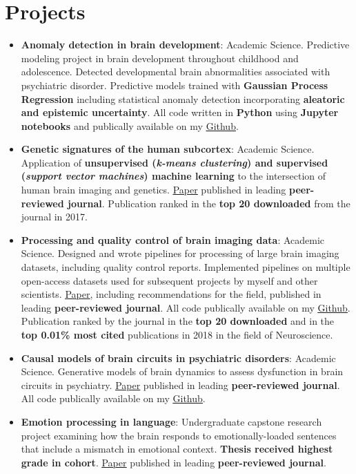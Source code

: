 \documentclass[letterpaper,10pt]{article}
\newcommand{\resumeItem}[2]{
  \item\small{
    \textbf{#1}{: #2 \vspace{-2pt}}
  }
}
\newcommand{\resumeSubItem}[2]{\resumeItem{#1}{#2}\vspace{-4pt}}
\newcommand{\resumeSubHeadingListStart}{\begin{itemize}[leftmargin=*]}
\newcommand{\resumeSubHeadingListEnd}{\end{itemize}}
\begin{document}
\section{Projects}
  \resumeSubHeadingListStart
    \resumeSubItem{Anomaly detection in brain development}
      {Academic Science. Predictive modeling project in brain development throughout childhood and adolescence. Detected developmental brain abnormalities associated with psychiatric disorder. Predictive models trained with \textbf{Gaussian Process Regression} including statistical anomaly detection incorporating \textbf{aleatoric and epistemic uncertainty}. All code written in \textbf{Python} using \textbf{Jupyter notebooks} and publically available on my \href{https://github.com/lindenmp/NormativeNeuroDev_CrossSec}{\underline{Github}}.}
    \resumeSubItem{Genetic signatures of the human subcortex}
      {Academic Science. Application of \textbf{unsupervised (\textit{k-means clustering}) and supervised (\textit{support vector machines}) machine learning} to the intersection of human brain imaging and genetics. \href{https://onlinelibrary.wiley.com/doi/full/10.1111/gbb.12386}{\underline{Paper}} published in leading \textbf{peer-reviewed journal}. Publication ranked in the \textbf{top 20 downloaded} from the journal in 2017.}
    \resumeSubItem{Processing and quality control of brain imaging data}
      {Academic Science. Designed and wrote pipelines for processing of large brain imaging datasets, including quality control reports. Implemented pipelines on multiple open-access datasets used for subsequent projects by myself and other scientists. \href{https://www.sciencedirect.com/science/article/pii/S1053811917310972}{\underline{Paper}}, including recommendations for the field, published in leading \textbf{peer-reviewed journal}. All code publically available on my \href{https://github.com/lindenmp/rs-fMRI}{\underline{Github}}. Publication ranked by the journal in the \textbf{top 20 downloaded} and in the \textbf{top 0.01\% most cited} publications in 2018 in the field of Neuroscience.}
    \resumeSubItem{Causal models of brain circuits in psychiatric disorders}
      {Academic Science. Generative models of brain dynamics to assess dysfunction in brain circuits in psychiatry. \href{https://www.sciencedirect.com/science/article/pii/S1053811919306585}{\underline{Paper}} published in leading \textbf{peer-reviewed journal}. All code publically available on my \href{https://github.com/lindenmp/rs-fMRI/tree/master/stats/spDCM}{\underline{Github}}.}
    \resumeSubItem{Emotion processing in language}
      {Undergraduate capstone research project examining how the brain responds to emotionally-loaded sentences that include a mismatch in emotional context. \textbf{Thesis received highest grade in cohort}. \href{https://onlinelibrary.wiley.com/doi/abs/10.1111/psyp.12601}{\underline{Paper}} published in leading \textbf{peer-reviewed journal}.}
  \resumeSubHeadingListEnd
\end{document}
